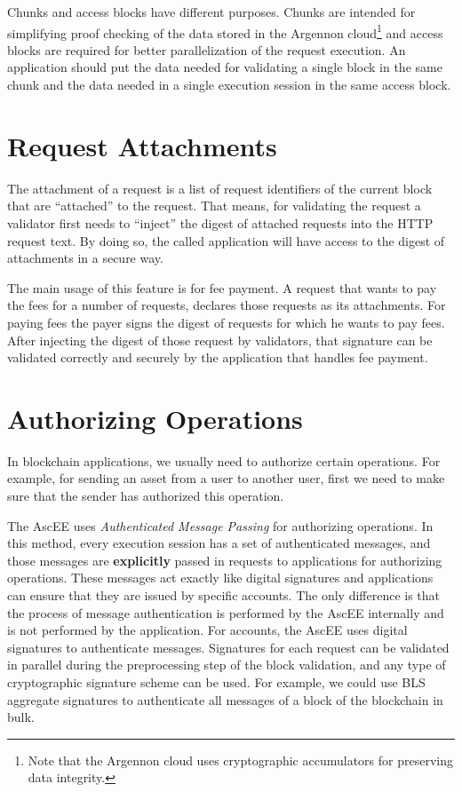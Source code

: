 Chunks and access blocks have different purposes. Chunks are intended for simplifying proof checking of the data
stored in the Argennon cloud\footnote{Note that
the Argennon cloud uses cryptographic accumulators for preserving data integrity.} and access blocks are
required for better parallelization of the request execution. An application should put the data needed for
validating a single block in the same chunk and the data needed in a single execution session in the same access block.


\section{Request Attachments}\label{sec:attachments}

The attachment of a request is a list of request identifiers of the current block that are ``attached'' to the request.
That means, for validating the request a validator first needs to ``inject'' the digest of attached requests into the
HTTP request text. By doing so, the called application will have access to the digest of attachments in a secure way.

The main usage of this feature is for fee payment. A request that wants to pay the fees for a number of requests,
declares those requests as its attachments. For paying fees the payer signs the digest of requests for which he
wants to pay fees. After injecting the digest of those request by validators, that signature can be validated
correctly and securely by the application that handles fee payment.


\section{Authorizing Operations}\label{sec:authorizing-operations}

In blockchain applications, we usually need to authorize certain operations. For example, for sending an asset
from a user to another user, first we need to make sure that the sender has authorized this operation.

The AscEE uses \emph{Authenticated Message Passing} for authorizing operations. In this method, every execution
session has a set of authenticated messages, and those messages are \textbf{explicitly} passed in requests to
applications for authorizing operations. These messages act exactly like digital signatures and applications can
ensure that they are issued by specific accounts. The only difference is that the process of message authentication
is performed by the AscEE internally and is not performed by the application. For accounts, the AscEE uses digital
signatures to authenticate messages. Signatures for each request can be validated in parallel during the
preprocessing step of the block validation, and any type of
cryptographic signature scheme can be used. For example, we could use BLS aggregate signatures to authenticate all
messages of a block of the blockchain in bulk.

